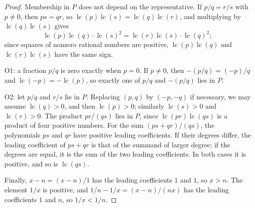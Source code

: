\begin{proof}
Membership in $P$ does not depend on the representative. If $p/q=r/s$ with $p\ne0$, then $ps=qr$, so $\operatorname{lc}(p)\operatorname{lc}(s)=\operatorname{lc}(q)\operatorname{lc}(r)$, and multiplying by $\operatorname{lc}(q)\operatorname{lc}(s)$ gives
\[
\operatorname{lc}(p)\operatorname{lc}(q)\cdot\operatorname{lc}(s)^2=\operatorname{lc}(r)\operatorname{lc}(s)\cdot\operatorname{lc}(q)^2 ;
\]
since squares of nonzero rational numbers are positive, $\operatorname{lc}(p)\operatorname{lc}(q)$ and $\operatorname{lc}(r)\operatorname{lc}(s)$ have the same sign.

O1: a fraction $p/q$ is zero exactly when $p=0$. If $p\ne0$, then $-(p/q)=(-p)/q$ and $\operatorname{lc}(-p)=-\operatorname{lc}(p)$, so exactly one of $p/q$ and $-(p/q)$ lies in $P$.

O2: let $p/q$ and $r/s$ lie in $P$. Replacing $(p,q)$ by $(-p,-q)$ if necessary, we may assume $\operatorname{lc}(q)>0$, and then $\operatorname{lc}(p)>0$; similarly $\operatorname{lc}(s)>0$ and $\operatorname{lc}(r)>0$. The product $pr/(qs)$ lies in $P$, since $\operatorname{lc}(pr)\operatorname{lc}(qs)$ is a product of four positive numbers. For the sum $(ps+qr)/(qs)$, the polynomials $ps$ and $qr$ have positive leading coefficients. If their degrees differ, the leading coefficient of $ps+qr$ is that of the summand of larger degree; if the degrees are equal, it is the sum of the two leading coefficients. In both cases it is positive, and so is $\operatorname{lc}(qs)$.

Finally, $x-n=(x-n)/1$ has the leading coefficients $1$ and $1$, so $x>n$. The element $1/x$ is positive, and $1/n-1/x=(x-n)/(nx)$ has the leading coefficients $1$ and $n$, so $1/x<1/n$.
\end{proof}

